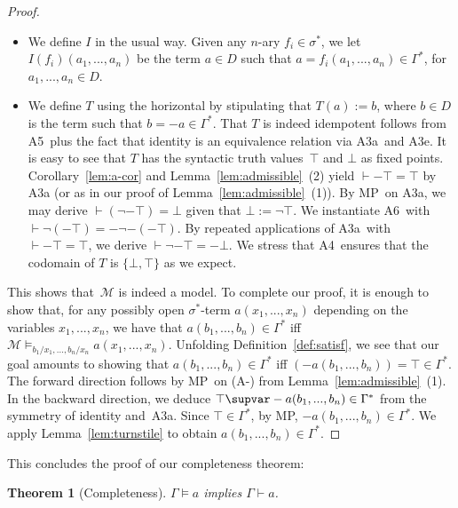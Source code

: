 \documentclass{preprint}
\newtheorem{theorem}{Theorem}[section]
\newcommand{\M}{\mathcal{M}}
\newcommand{\iiia}{A3a}%
\newcommand{\iiie}{A3e}%
\newcommand{\iv}{A4}%
\newcommand{\ahor}{A5}%
\newcommand{\aneg}{A6}%
\renewcommand{\mp}{MP}%
\renewcommand{\to}{\supvar}
\begin{document}
\begin{proof}
\begin{itemize}
	
	\item We define $I$ in the usual way. Given any $n$-ary $f_i \in \sigma^*$, we let $I(f_i)(a_1,...,a_n)$ be the term $a \in D$ such that $a = f_i(a_1,...,a_n) \in \Gamma^*$, for $a_1, ..., a_n \in D$. 
	
	
	\item We define $T$ using the horizontal by stipulating that $T(a):=b$, where $b \in D$ is the term such that $b = -a \in \Gamma^*$. That $T$ is indeed idempotent follows from \ahor~plus the fact that identity is an equivalence relation via \iiia~and \iiie. It is easy to see that $T$ has the syntactic truth values~$\top$ and $\bot$ as fixed points. 
	Corollary~\ref{lem:a-cor} and Lemma~\ref{lem:admissible}~(2) yield $\vdash -\top = \top$ by {\iiia} (or as in our proof of Lemma~\ref{lem:admissible}~(1)).  
	By \mp~on \iiia, we may derive $\vdash (\neg -\top) = \bot$ given that $\bot := \neg \top$. 
	We instantiate \aneg~with $\vdash \neg (-\top) = - \neg - (-\top)$. 
	By repeated applications of \iiia~with $\vdash -\top = \top$, we derive $\vdash \neg -\top = - \bot$. We stress that \iv~ensures that the codomain of $T$ is $\{\bot, \top\}$ as we expect. 
\end{itemize}



This shows that~$\mathcal{M}$ is indeed a model. To complete our proof, it is enough to show that, for any possibly open $\sigma^*$-term $a(x_1, ..., x_n)$ depending on the variables $x_1, ..., x_n$, we have that $a(b_1, ..., b_n) \in \Gamma^*$ iff $\M \vDash_{b_1/x_1, ..., b_n/x_n} a(x_1, ..., x_n)$. 
Unfolding Definition~\ref{def:satisf}, we see that our goal amounts to showing that $a(b_1, ..., b_n) \in \Gamma^*$ iff $(-a(b_1, ..., b_n)) = \top \in \Gamma^*$. 
The forward direction follows by \mp~on (A-) from Lemma~\ref{lem:admissible}~(1). 
In the backward direction, we deduce $\top \to -a(b_1, ..., b_n) \in \Gamma^*$ from the symmetry of identity and~\iiia. Since $\top \in \Gamma^*$, by \mp, $-a(b_1, ..., b_n) \in \Gamma^*$. 
We apply Lemma~\ref{lem:turnstile} to obtain $a(b_1, ..., b_n) \in \Gamma^*$. 
\end{proof}

This concludes the proof of our completeness theorem:

\begin{theorem}[Completeness]
	$\Gamma \vDash a$ implies $\Gamma \vdash a$. 
\end{theorem}
\end{document}
